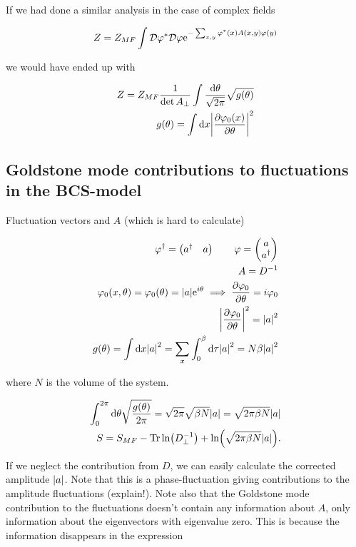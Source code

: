 If we had done a similar analysis in the case of complex fields

\begin{align*}
    Z = Z_{MF} \int \mathcal{D} \varphi^* \mathcal{D} \varphi \mathrm{e}^{-\sum_{x,y} \varphi^*(x) A(x,y) \varphi (y)}
\end{align*}

we would have ended up with 

\begin{align*}
    Z = Z_{MF} \frac{1}{\det A_\perp} \int \frac{\dd \theta}{\sqrt{2\pi}}\sqrt{g(\theta)} \\ g(\theta) = \int \dd x \abs{\pdv{\varphi_0(x)}{\theta}}^2 
\end{align*}

\subsection{Goldstone mode contributions to fluctuations in the BCS-model}

Fluctuation vectors and $A$ (which is hard to calculate)

\begin{align*}
    \varphi^{\dagger} = \begin{pmatrix} a^{\dagger} & a \end{pmatrix} \quad \quad \varphi = \begin{pmatrix} a \\ a^{\dagger} \end{pmatrix} \\
    A = D^{-1} \\
    \varphi_0(x,\theta) = \varphi_0(\theta) = \abs{a}\mathrm{e}^{i\theta} \implies \pdv{\varphi_0}{\theta} = i\varphi_0 \\
    \abs{\pdv{\varphi_0}{\theta}}^2 = \abs{a}^2 \\
    g(\theta) = \int \dd x \abs{a}^2 = \sum_x \int_{0}^{\beta} \dd \tau \abs{a}^2 = N\beta \abs{a}^2 
\end{align*}

where $N$ is the volume of the system. 

\begin{align*}
    \int_{0}^{2\pi} \dd \theta \sqrt{\frac{g(\theta)}{2\pi}} = \sqrt{2\pi}\sqrt{\beta N} \abs{a} = \sqrt{2\pi \beta N} \abs{a} \\ 
    S = S_{MF} - \Tr \ln (D^{-1}_\perp ) + \ln(\sqrt{2\pi \beta N}\abs{a}). 
\end{align*}

If we neglect the contribution from $D$, we can easily calculate the corrected amplitude $\abs{a}$. Note that this is a phase-fluctuation giving contributions to the amplitude fluctuations (explain!). Note also that the Goldstone mode contribution to the fluctuations doesn't contain any information about $A$, only information about the eigenvectors with eigenvalue zero. This is because the information disappears in the expression 

